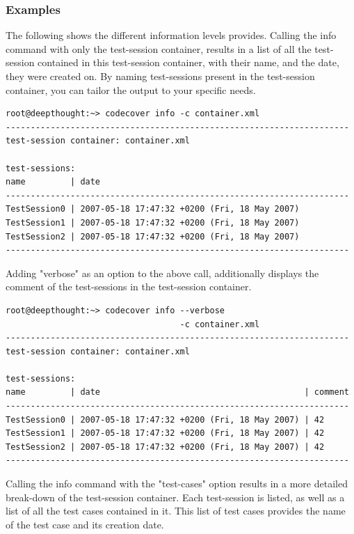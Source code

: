 \subsubsection{Examples}\label{command:info:examples}
The following shows the different information levels \codecover provides. Calling the info command with only the test-session container, results in a list of all the test-session contained in this test-session container, with their name, and the date, they were created on. By naming test-sessions present in the test-session container, you can tailor the output to your specific needs.

\begin{verbatim}
root@deepthought:~> codecover info -c container.xml
---------------------------------------------------------------------
test-session container: container.xml

test-sessions:
name         | date                                        
---------------------------------------------------------------------
TestSession0 | 2007-05-18 17:47:32 +0200 (Fri, 18 May 2007)
TestSession1 | 2007-05-18 17:47:32 +0200 (Fri, 18 May 2007)
TestSession2 | 2007-05-18 17:47:32 +0200 (Fri, 18 May 2007)
---------------------------------------------------------------------	
\end{verbatim}

Adding "verbose" as an option to the above call, additionally displays the comment of the test-sessions in the test-session container.

\begin{verbatim}
root@deepthought:~> codecover info --verbose
                                   -c container.xml
---------------------------------------------------------------------
test-session container: container.xml

test-sessions:
name         | date                                         | comment
---------------------------------------------------------------------
TestSession0 | 2007-05-18 17:47:32 +0200 (Fri, 18 May 2007) | 42
TestSession1 | 2007-05-18 17:47:32 +0200 (Fri, 18 May 2007) | 42
TestSession2 | 2007-05-18 17:47:32 +0200 (Fri, 18 May 2007) | 42
---------------------------------------------------------------------
\end{verbatim}

Calling the info command with the "test-cases" option results in a more detailed break-down of the test-session container. Each test-session is listed, as well as a list of all the test cases contained in it. This list of test cases provides the name of the test case and its creation date.

